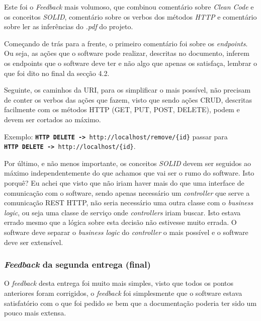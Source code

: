 Este foi o \textit{Feedback} mais volumoso, que combinou comentário sobre \textit{Clean Code} e os conceitos \textit{SOLID}, comentário sobre os verbos dos métodos \textit{HTTP} e comentário sobre ler as inferências do \textit{.pdf} do projeto.

Começando de trás para a frente, o primeiro comentário foi sobre os \textit{endpoints}. Ou seja, as ações que o software pode realizar, descritas no documento, inferem os endpoints que o software deve ter e não algo que apenas os satisfaça, lembrar o que foi dito no final da secção 4.2.

Seguinte, os caminhos da URI, para os simplificar o mais possível, não precisam de conter os verbos das ações que fazem, visto que sendo ações CRUD, descritas facilmente com os métodos HTTP (GET, PUT, POST, DELETE), podem e devem ser cortados ao máximo.

Exemplo: \texttt{\textbf{HTTP DELETE ->} http://localhost/remove/\{id\}} passar para\\\texttt{\textbf{HTTP DELETE ->} http://localhost/\{id\}}.

Por último, e não menos importante, os conceitos \textit{SOLID} devem ser seguidos ao máximo independentemente do que achamos que vai ser o rumo do software. Isto porquê? Eu achei que visto que não iriam haver mais do que uma interface de comunicação com o software, sendo apenas necessário um \textit{controller} que serve a comunicação REST HTTP, não seria necessário uma outra classe com o \textit{business logic}, ou seja uma classe de serviço onde \textit{controllers} iriam buscar. Isto estava errado mesmo que a lógica sobre esta decisão não estivesse muito errada. O software deve separar o \textit{business logic} do \textit{controller} o mais possível e o software deve ser extensível.

\subsubsection{\textit{Feedback} da segunda entrega (final)}

O \textit{feedback} desta entrega foi muito mais simples, visto que todos os pontos anteriores foram corrigidos, o \textit{feedback} foi simplesmente que o software estava satisfatório com o que foi pedido se bem que a documentação poderia ter sido um pouco mais extensa.
